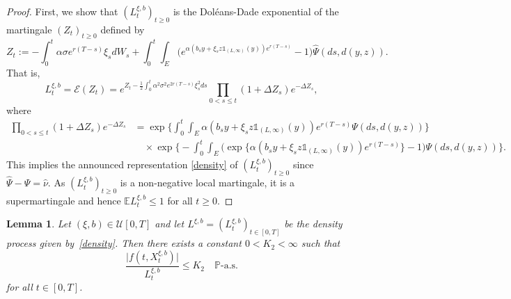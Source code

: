 \documentclass[reqno, 11pt]{amsart}%
\newcommand{\Eop}{\mathbb{E}}
\newcommand{\Pop}{\mathbb{P}}
\newcommand{\prT}[1]{#1=(#1_t)_{t\in[0,T]}}
\newcommand{\xib}{(\xi,b)}
\newtheorem{lemma}[theorem]{Lemma}
\theoremstyle{definition}
\numberwithin{equation}{section} \numberwithin{theorem}{section}
\begin{document}
\begin{proof}
   First, we show that $(L_t^{\xi,b})_{t\ge0}$ is the Dol\'{e}ans-Dade exponential of the martingale $(Z_t)_{t\ge0}$ defined by
   \begin{equation*}
   Z_t := -\int_0^t \alpha \sigma e^{r(T-s)}\xi_sdW_s + \int_0^t \int_E \Big(e^{\alpha(b_s y+ \xi_s z \mathds{1}_{(L,\infty)}(y))e^{r(T-s)}}-1\Big)\hat{\Psi}(ds,d(y,z)).
   \end{equation*}
   That is,
   \begin{equation*}
   L_t^{\xi,b} = \mathcal{E}(Z_t) = e^{Z_t - \frac12\int_0^t \alpha^2\sigma^2e^{2r(T-s)}\xi_s^2ds}\prod_{0<s\le t}(1+\Delta Z_s)e^{-\Delta Z_s},
   \end{equation*}
   where
   \begin{align*}
   \prod_{0<s\le t}\!(1\!+\!\Delta Z_s)e^{-\Delta Z_s} &= \exp\bigg\{\int_0^t\!\int_E \alpha(b_s y+ \xi_s z \mathds{1}_{(L,\infty)}(y))e^{r(T-s)}\Psi(ds,d(y,z))\bigg\} \\
   &\quad\times\! \exp\bigg\{\!\!-\!\int_0^t\!\int_E\! \Big(\!\exp\Big\{\alpha(b_s y+ \xi_s z \mathds{1}_{(L,\infty)}(y))e^{r(T-s)}\Big\}\!-\!1\Big)\Psi(ds,d(y,z))\bigg\}.
   \end{align*}
   This implies the announced representation \eqref{density} of $(L_t^{\xi,b})_{t\ge0}$ since $\hat\Psi-\Psi = \hat\nu$. As $(L_t^{\xi,b})_{t\ge0}$  is a non-negative local martingale, it is a supermartingale and hence $\Eop L_t^{\xi,b} \le 1$ for all $t\ge 0$. 
\end{proof}

\begin{lemma}\label{fbounded}
   Let $\xib\in \mathcal{U}[0,T]$ and let $\prT{L^{\xi,b}}$ be the density process given by~\eqref{density}.
   Then there exists a constant $0<K_2<\infty$ such that 
   \begin{equation*}
   \frac{\big|f(t,X^{\xi,b}_t)\big|}{L^{\xi,b}_t}\le K_2\quad\Pop\text{-a.s.}
   \end{equation*}
   for all $t\in[0,T]$.
\end{lemma}
\end{document}
